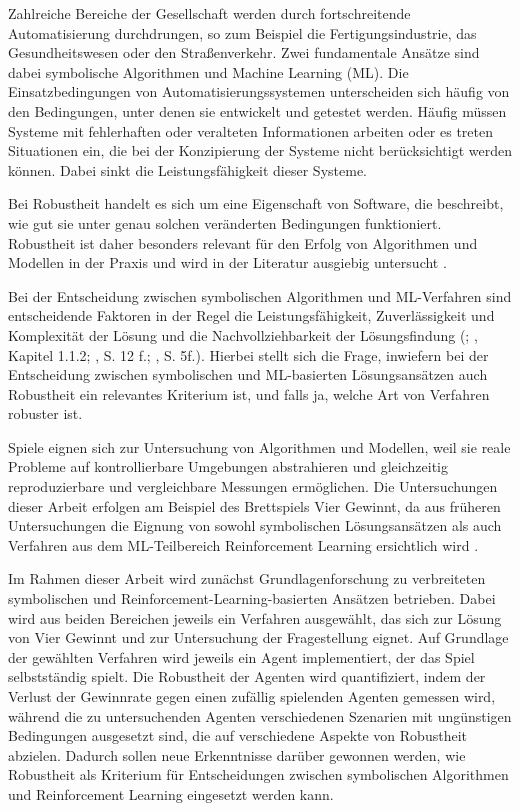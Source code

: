 Zahlreiche Bereiche der Gesellschaft werden durch fortschreitende Automatisierung durchdrungen, so zum Beispiel die Fertigungsindustrie, das Gesundheitswesen oder den Straßenverkehr. Zwei fundamentale Ansätze sind dabei symbolische Algorithmen und Machine Learning (ML). Die Einsatzbedingungen von Automatisierungssystemen unterscheiden sich häufig von den Bedingungen, unter denen sie entwickelt und getestet werden. Häufig müssen Systeme mit fehlerhaften oder veralteten Informationen arbeiten oder es treten Situationen ein, die bei der Konzipierung der Systeme nicht berücksichtigt werden können. Dabei sinkt die Leistungsfähigkeit dieser Systeme.

Bei Robustheit handelt es sich um eine Eigenschaft von Software, die beschreibt, wie gut sie unter genau solchen veränderten Bedingungen funktioniert. Robustheit ist daher besonders relevant für den Erfolg von Algorithmen und Modellen in der Praxis und wird in der Literatur ausgiebig untersucht \cite{Micskei.2012} \cite{Moos.2022} \cite{Ni.2021}.

Bei der Entscheidung zwischen symbolischen Algorithmen und ML-Verfahren sind entscheidende Faktoren in der Regel die Leistungsfähigkeit, Zuverlässigkeit und Komplexität der Lösung und die Nachvollziehbarkeit der Lösungsfindung (\cite{Dabas.2022}; \cite{Ferguson.January2019}, Kapitel 1.1.2; \cite{Humm.2020}, S. 12 f.; \cite{Früh.2022}, S. 5f.). Hierbei stellt sich die Frage, inwiefern bei der Entscheidung zwischen symbolischen und ML-basierten Lösungsansätzen auch Robustheit ein relevantes Kriterium ist, und falls ja, welche Art von Verfahren robuster ist.

Spiele eignen sich zur Untersuchung von Algorithmen und Modellen, weil sie reale Probleme auf kontrollierbare Umgebungen abstrahieren und gleichzeitig reproduzierbare und vergleichbare Messungen ermöglichen. Die Untersuchungen dieser Arbeit erfolgen am Beispiel des Brettspiels Vier Gewinnt, da aus früheren Untersuchungen die Eignung von sowohl symbolischen Lösungsansätzen als auch Verfahren aus dem ML-Teilbereich Reinforcement Learning ersichtlich wird \cite{Qiu.2022} \cite{Sheoran.2022} \cite{Taylor.2024} \cite{Dabas.2022} \cite{Wäldchen.2022}.

Im Rahmen dieser Arbeit wird zunächst Grundlagenforschung zu verbreiteten symbolischen und Reinforcement-Learning-basierten Ansätzen betrieben. Dabei wird aus beiden Bereichen jeweils ein Verfahren ausgewählt, das sich zur Lösung von Vier Gewinnt und zur Untersuchung der Fragestellung eignet. Auf Grundlage der gewählten Verfahren wird jeweils ein Agent implementiert, der das Spiel selbstständig spielt. Die Robustheit der Agenten wird quantifiziert, indem der Verlust der Gewinnrate gegen einen zufällig spielenden Agenten gemessen wird, während die zu untersuchenden Agenten verschiedenen Szenarien mit ungünstigen Bedingungen ausgesetzt sind, die auf verschiedene Aspekte von Robustheit abzielen. Dadurch sollen neue Erkenntnisse darüber gewonnen werden, wie Robustheit als Kriterium für Entscheidungen zwischen symbolischen Algorithmen und Reinforcement Learning eingesetzt werden kann.
